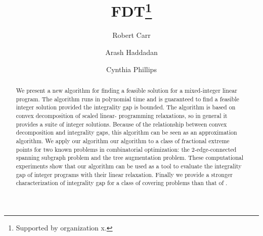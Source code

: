 \documentclass[runningheads]{llncs}
\begin{document}
%
\title{FDT\thanks{Supported by organization x.}}
%
%
\author{Robert Carr\orcidID{} \and
Arash Haddadan\orcidID{} \and
Cynthia Phillips\orcidID{}}
%
%
%
\maketitle              %
%
\begin{abstract}
We present a new algorithm for finding a feasible solution for a mixed-integer linear program. The algorithm runs in polynomial time and is guaranteed to find a feasible integer solution provided the
integrality gap is bounded. The algorithm is based on convex decomposition of scaled linear-
programming relaxations, so in general it provides a suite of integer solutions. Because of the
relationship between convex decomposition and integrality gaps, this algorithm can be seen as an approximation algorithm. We apply our algorithm our algorithm to a class of 
fractional extreme points for two known problems in combinatorial optimization: the 2-edge-connected spanning subgraph problem and the tree augmentation problem. These computational experiments show that our algorithm can be used as a tool to evaluate the integrality gap of integer programs with their linear relaxation. Finally we provide a stronger characterization of integrality gap for a class of covering problems than that of \cite{goemans}. 

\end{abstract}
%
%
%



\iffalse{

}\fi
\end{document}
